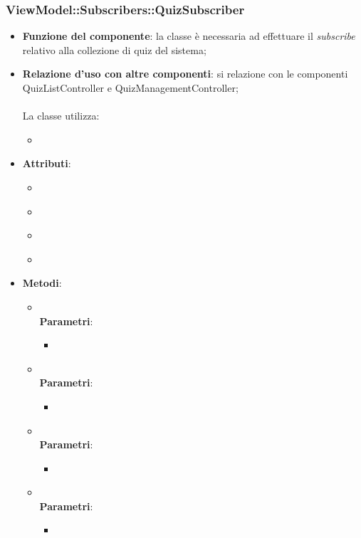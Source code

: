 \subsubsection{ViewModel::Subscribers::QuizSubscriber}
\begin{itemize}
\item\textbf{Funzione del componente}: la classe è necessaria ad effettuare il \emph{subscribe} relativo alla collezione di quiz del sistema;
	\item\textbf{Relazione d'uso con altre componenti}: si relazione con le componenti QuizListController e QuizManagementController;\\ \\
La classe utilizza:
	\begin{itemize}
		\item
	\end{itemize}
\item\textbf{Attributi}:
	\begin{itemize}
		\item\code{}\\
		\item\code{}\\
		\item\code{}\\
		\item\code{}\\
	\end{itemize}
\item\textbf{Metodi}:
	\begin{itemize}
		\item\code{}\\
		\textbf{Parametri}:
			\begin{itemize}
				\item\code{}\\
			\end{itemize}
		\item\code{}\\
		\textbf{Parametri}:
			\begin{itemize}
				\item\code{}\\
			\end{itemize}
		\item\code{}\\
		\textbf{Parametri}:
			\begin{itemize}
				\item\code{}\\
			\end{itemize}
		\item\code{}\\
		\textbf{Parametri}:
			\begin{itemize}
				\item\code{}\\
			\end{itemize}
	\end{itemize}
\end{itemize}

